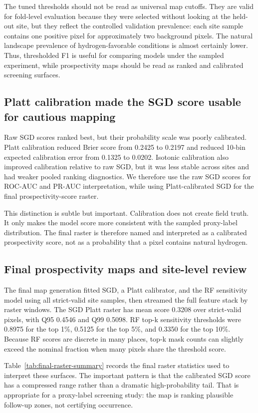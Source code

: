 \documentclass[numrefs]{interact}
\theoremstyle{plain}%
\theoremstyle{definition}
\theoremstyle{remark}
\begin{document}
The tuned thresholds should not be read as universal map cutoffs. They are valid for fold-level evaluation because they were selected without looking at the held-out site, but they reflect the controlled validation prevalence: each site sample contains one positive pixel for approximately two background pixels. The natural landscape prevalence of hydrogen-favorable conditions is almost certainly lower. Thus, thresholded F1 is useful for comparing models under the sampled experiment, while prospectivity maps should be read as ranked and calibrated screening surfaces.

\subsection{Platt calibration made the SGD score usable for cautious mapping}
Raw SGD scores ranked best, but their probability scale was poorly calibrated. Platt calibration reduced Brier score from 0.2425 to 0.2197 and reduced 10-bin expected calibration error from 0.1325 to 0.0202. Isotonic calibration also improved calibration relative to raw SGD, but it was less stable across sites and had weaker pooled ranking diagnostics. We therefore use the raw SGD scores for ROC-AUC and PR-AUC interpretation, while using Platt-calibrated SGD for the final prospectivity-score raster.

This distinction is subtle but important. Calibration does not create field truth. It only makes the model score more consistent with the sampled proxy-label distribution. The final raster is therefore named and interpreted as a calibrated prospectivity score, not as a probability that a pixel contains natural hydrogen.

\subsection{Final prospectivity maps and site-level review}
The final map generation fitted SGD, a Platt calibrator, and the RF sensitivity model using all strict-valid site samples, then streamed the full feature stack by raster windows. The SGD Platt raster has mean score 0.3208 over strict-valid pixels, with Q95 0.4546 and Q99 0.5098. RF top-k sensitivity thresholds were 0.8975 for the top 1\%, 0.5125 for the top 5\%, and 0.3350 for the top 10\%. Because RF scores are discrete in many places, top-k mask counts can slightly exceed the nominal fraction when many pixels share the threshold score.

Table~\ref{tab:final-raster-summary} records the final raster statistics used to interpret these surfaces. The important pattern is that the calibrated SGD score has a compressed range rather than a dramatic high-probability tail. That is appropriate for a proxy-label screening study: the map is ranking plausible follow-up zones, not certifying occurrence.
\end{document}
